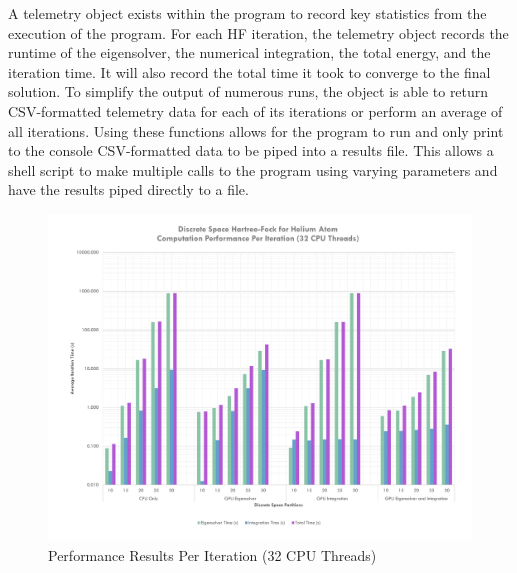 \documentclass[conference, twoside]{IEEEtran}
\begin{document}
A telemetry object exists within the program to record key statistics from the execution of the program. For each HF iteration, the telemetry object records the runtime of the eigensolver, the numerical integration, the total energy, and the iteration time. It will also record the total time it took to converge to the final solution. To simplify the output of numerous runs, the object is able to return CSV-formatted telemetry data for each of its iterations or perform an average of all iterations. Using these functions allows for the program to run and only print to the console CSV-formatted data to be piped into a results file. This allows a shell script to make multiple calls to the program using varying parameters and have the results piped directly to a file.

\begin{figure}[ht] %
\centering
\includegraphics[width=7in]{figures/thirtytwo-thread-results.pdf}
\caption{Performance Results Per Iteration (32 CPU Threads)}
\label{perf-results-per-iteration-thirtytwo-thread}
\end{figure}
\end{document}
